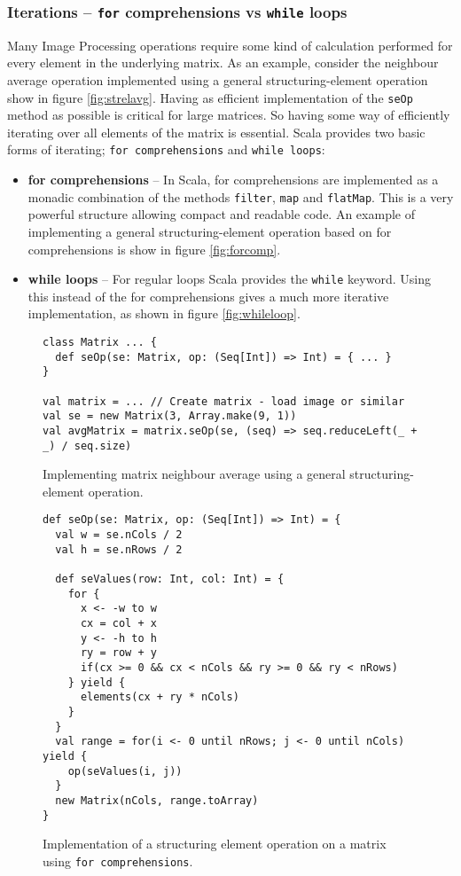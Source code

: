 \documentclass[a4paper,english]{report}
\begin{document}
\subsubsection{Iterations -- \texttt{for} comprehensions vs \texttt{while} loops}

Many Image Processing operations require some kind of calculation
performed for every element in the underlying matrix. As an example,
consider the neighbour average operation implemented using a general
structuring-element operation show in figure
\vref{fig:strelavg}. Having as efficient implementation of the
\texttt{seOp} method as possible is critical for large matrices. So
having some way of efficiently iterating over all elements of the
matrix is essential. Scala provides two basic forms of iterating;
\texttt{for comprehensions} and \texttt{while loops}:

\begin{itemize}
\item \textbf{for comprehensions} -- In Scala, for comprehensions are
  implemented as a monadic combination of the methods \texttt{filter},
  \texttt{map} and \texttt{flatMap}. This is a very powerful structure
  allowing compact and readable code. An example of implementing a
  general structuring-element operation based on for comprehensions is
  show in figure \vref{fig:forcomp}.
\item \textbf{while loops} -- For regular loops Scala provides the
  \texttt{while} keyword. Using this instead of the for comprehensions
  gives a much more iterative implementation, as shown in figure
  \vref{fig:whileloop}.
\end{itemize}

\begin{figure}
  \begin{lstlisting}
class Matrix ... {
  def seOp(se: Matrix, op: (Seq[Int]) => Int) = { ... }
}

val matrix = ... // Create matrix - load image or similar
val se = new Matrix(3, Array.make(9, 1))
val avgMatrix = matrix.seOp(se, (seq) => seq.reduceLeft(_ + _) / seq.size)
  \end{lstlisting}
  \caption{Implementing matrix neighbour average using a general
    structuring-element operation.\label{fig:strelavg}}
\end{figure}

\begin{figure}
  \begin{lstlisting}
def seOp(se: Matrix, op: (Seq[Int]) => Int) = {
  val w = se.nCols / 2
  val h = se.nRows / 2

  def seValues(row: Int, col: Int) = {
    for {
      x <- -w to w
      cx = col + x
      y <- -h to h
      ry = row + y
      if(cx >= 0 && cx < nCols && ry >= 0 && ry < nRows)
    } yield {
      elements(cx + ry * nCols)
    }
  }
  val range = for(i <- 0 until nRows; j <- 0 until nCols) yield {
    op(seValues(i, j))
  }
  new Matrix(nCols, range.toArray)
}
  \end{lstlisting}
  \caption{Implementation of a structuring element operation on a
    matrix using \texttt{for comprehensions}.\label{fig:forcomp}}
\end{figure}
\end{document}
